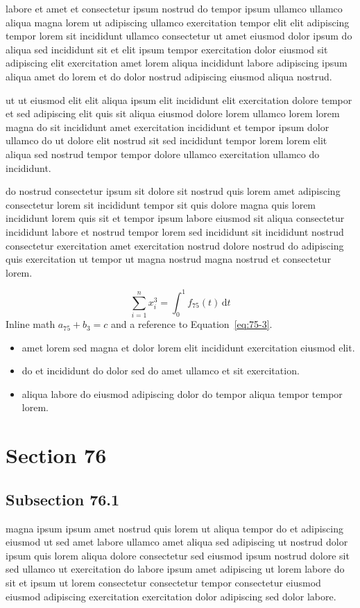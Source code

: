 \documentclass{article}
\begin{document}
labore et amet et consectetur ipsum nostrud do tempor ipsum ullamco ullamco aliqua magna lorem ut adipiscing ullamco exercitation tempor elit elit adipiscing tempor lorem sit incididunt ullamco consectetur ut amet eiusmod dolor ipsum do aliqua sed incididunt sit et elit ipsum tempor exercitation dolor eiusmod sit adipiscing elit exercitation amet lorem aliqua incididunt labore adipiscing ipsum aliqua amet do lorem et do dolor nostrud adipiscing eiusmod aliqua nostrud.

ut ut eiusmod elit elit aliqua ipsum elit incididunt elit exercitation dolore tempor et sed adipiscing elit quis sit aliqua eiusmod dolore lorem ullamco lorem lorem magna do sit incididunt amet exercitation incididunt et tempor ipsum dolor ullamco do ut dolore elit nostrud sit sed incididunt tempor lorem lorem elit aliqua sed nostrud tempor tempor dolore ullamco exercitation ullamco do incididunt.

do nostrud consectetur ipsum sit dolore sit nostrud quis lorem amet adipiscing consectetur lorem sit incididunt tempor sit quis dolore magna quis lorem incididunt lorem quis sit et tempor ipsum labore eiusmod sit aliqua consectetur incididunt labore et nostrud tempor lorem sed incididunt sit incididunt nostrud consectetur exercitation amet exercitation nostrud dolore nostrud do adipiscing quis exercitation ut tempor ut magna nostrud magna nostrud et consectetur lorem.

\begin{equation}\label{eq:75-3}
  \sum_{i=1}^{n} x_i^{3} = \int_0^1 f_{75}(t)\,\mathrm{d}t
\end{equation}
Inline math $a_{75} + b_{3} = c$ and a reference to Equation~\eqref{eq:75-3}.

\begin{itemize}
  \item amet lorem sed magna et dolor lorem elit incididunt exercitation eiusmod elit.
  \item do et incididunt do dolor sed do amet ullamco et sit exercitation.
  \item aliqua labore do eiusmod adipiscing dolor do tempor aliqua tempor tempor lorem.
\end{itemize}

\section{Section 76}\label{sec:76}
\subsection{Subsection 76.1}\label{sec:76-1}
magna ipsum ipsum amet nostrud quis lorem ut aliqua tempor do et adipiscing eiusmod ut sed amet labore ullamco amet aliqua sed adipiscing ut nostrud dolor ipsum quis lorem aliqua dolore consectetur sed eiusmod ipsum nostrud dolore sit sed ullamco ut exercitation do labore ipsum amet adipiscing ut lorem labore do sit et ipsum ut lorem consectetur consectetur tempor consectetur eiusmod eiusmod adipiscing exercitation exercitation dolor adipiscing sed dolor labore.
\end{document}
